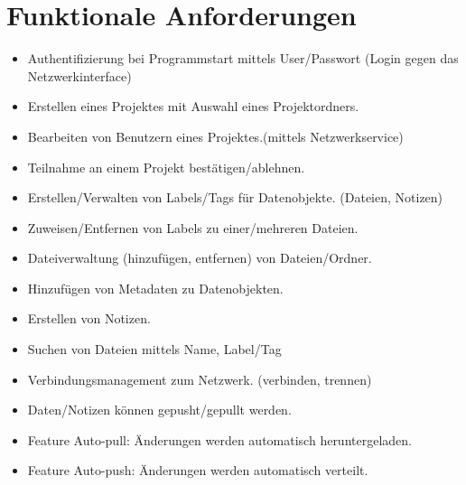
\section{Funktionale Anforderungen}
\begin{itemize}
  \item Authentifizierung bei Programmstart mittels User/Passwort (Login gegen das Netzwerkinterface)
  \item Erstellen eines Projektes mit Auswahl eines Projektordners.
  \item Bearbeiten von Benutzern eines Projektes.(mittels Netzwerkservice)
  \item Teilnahme an einem Projekt bestätigen/ablehnen.
  \item Erstellen/Verwalten von Labels/Tags für Datenobjekte. (Dateien, Notizen)
  \item Zuweisen/Entfernen von Labels zu einer/mehreren Dateien.
  \item Dateiverwaltung (hinzufügen, entfernen) von Dateien/Ordner.
  \item Hinzufügen von Metadaten zu Datenobjekten.
  \item Erstellen von Notizen.
  \item Suchen von Dateien mittels Name, Label/Tag
  \item Verbindungsmanagement zum Netzwerk. (verbinden, trennen)
  \item Daten/Notizen können gepusht/gepullt werden.
  \item Feature Auto-pull: Änderungen werden automatisch heruntergeladen.
  \item Feature Auto-push: Änderungen werden automatisch verteilt.
\end{itemize}